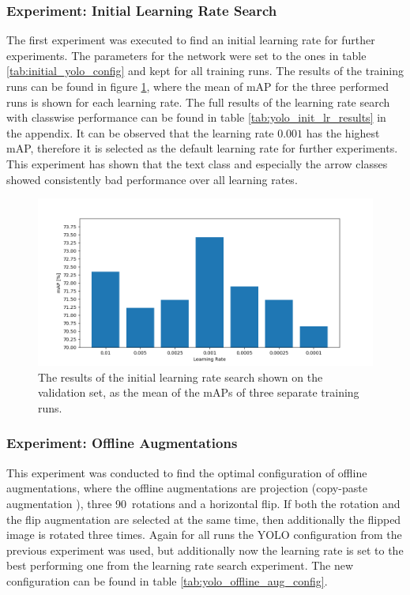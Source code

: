 \subsubsection{Experiment: Initial Learning Rate Search}

The first experiment was executed to find an initial learning rate for further experiments.
The parameters for the network were set to the ones in table \ref{tab:initial_yolo_config} and kept for all training runs.
The results of the training runs can be found in figure \ref{fig:yolo_lr_experiment_results}, where the mean of mAP for the three performed runs is shown for each learning rate.
The full results of the learning rate search with classwise performance can be found in table \ref{tab:yolo_init_lr_results} in the appendix.
It can be observed that the learning rate $0.001$ has the highest \ac{mAP}, therefore it is selected as the default learning rate for further experiments.
This experiment has shown that the text class and especially the arrow classes showed consistently bad performance over all learning rates.

\begin{figure}
\begin{center}
    \includegraphics[width=16cm]{imgs/yolo_lr_experiment.png}
    \caption{The results of the initial learning rate search shown on the validation set, as the mean of the mAPs of three separate training runs.}
    \label{fig:yolo_lr_experiment_results}
\end{center}
\end{figure}


\subsubsection{Experiment: Offline Augmentations}

This experiment was conducted to find the optimal configuration of offline augmentations, where the offline augmentations are projection (copy-paste augmentation \cite{copypaste_aug}), three 90\textdegree\ rotations and a horizontal flip.
If both the rotation and the flip augmentation are selected at the same time, then additionally the flipped image is rotated three times.
Again for all runs the YOLO configuration from the previous experiment was used, but additionally now the learning rate is set to the best performing one from the learning rate search experiment.
The new configuration can be found in table \ref{tab:yolo_offline_aug_config}.


